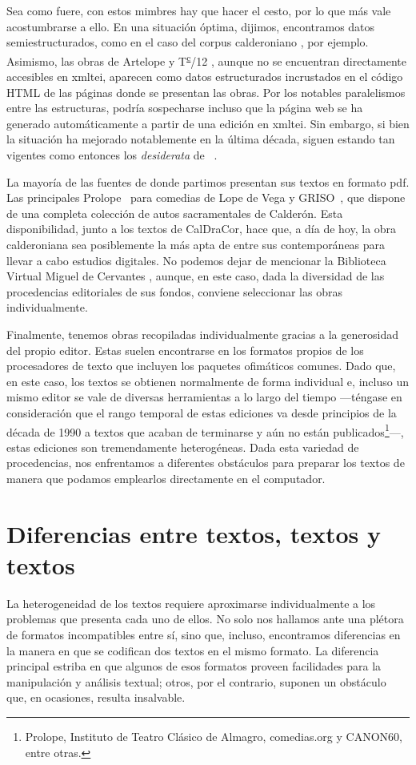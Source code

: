 Sea como fuere, con estos mimbres hay que hacer el cesto, por lo que más vale acostumbrarse a ello. En una situación óptima, dijimos, encontramos datos semiestructurados, como en el caso del corpus calderoniano  \parencite{caldracor2022}, por ejemplo. Asimismo, las obras de Artelope \parencite{oleza2022} y  T\textsuperscript{\underline{c}}/12 \parencite{tc12}, aunque no se encuentran directamente accesibles en \ac{xmltei}, aparecen como datos estructurados incrustados en el código HTML de las páginas donde se presentan las obras. Por los notables paralelismos entre las estructuras, podría sospecharse incluso que la página web se ha generado automáticamente a partir de una edición en \ac{xmltei}. Sin embargo, si bien la situación ha mejorado notablemente en la última década, siguen estando tan vigentes como entonces los \textit{desiderata} de \citeauthor{valdes2014b}~\parencite*{valdes2014b}. 

La mayoría de las fuentes de donde partimos presentan sus textos en formato \ac{pdf}. Las principales Prolope~\parencite{prolope2023} para comedias de Lope de Vega y GRISO~\parencite*{griso2020}, que dispone de una completa colección de autos sacramentales de Calderón. Esta disponibilidad, junto a los textos de CalDraCor, hace que, a día de hoy, la obra calderoniana sea posiblemente la más apta de entre sus contemporáneas para llevar a cabo estudios digitales. No podemos dejar de mencionar la Biblioteca Virtual Miguel de Cervantes \parencite{cvc2021}, aunque, en este caso, dada la diversidad de las procedencias editoriales de sus fondos, conviene seleccionar las obras individualmente.

Finalmente, tenemos obras recopiladas individualmente gracias a la generosidad del propio editor. Estas suelen encontrarse en los formatos propios de los procesadores de texto que incluyen los paquetes ofimáticos comunes. Dado que, en este caso, los textos se obtienen normalmente de forma individual e, incluso un mismo editor se vale de diversas herramientas a lo largo del tiempo —téngase en consideración que el rango temporal de estas ediciones va desde principios de la década de 1990 a textos que acaban de terminarse y aún no están publicados\footnote{Prolope, Instituto de Teatro Clásico de Almagro,  comedias.org y CANON60, entre otras.}—, estas ediciones son tremendamente heterogéneas.  Dada esta variedad de procedencias, nos enfrentamos a diferentes obstáculos para preparar los textos de manera que podamos emplearlos directamente en el computador.

\section{Diferencias entre textos, textos y textos}
La heterogeneidad de los textos requiere aproximarse individualmente a los problemas que presenta cada uno de ellos. No solo nos hallamos ante una plétora de formatos incompatibles entre sí, sino que, incluso, encontramos diferencias en la manera en que se codifican dos textos en el mismo formato. La diferencia principal estriba en que algunos de esos formatos proveen facilidades para la manipulación y análisis textual; otros, por el contrario, suponen un obstáculo que, en ocasiones, resulta insalvable.

